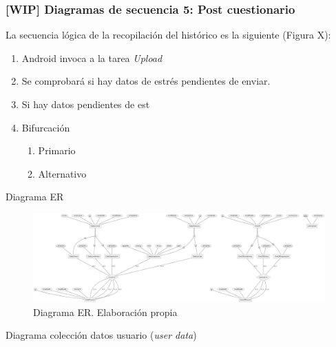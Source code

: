     \subsubsection{[WIP] Diagramas de secuencia 5: Post cuestionario}
        La secuencia lógica de la recopilación del histórico es la siguiente (Figura X):

        \begin{enumerate}
            \item Android invoca a la tarea \textit{Upload}
            \item Se comprobará si hay datos de estrés pendientes de enviar.
            \item Si hay datos pendientes de est
            \item Bifurcación
            \begin{enumerate}
                \item Primario
                \item Alternativo
            \end{enumerate}
        \end{enumerate}

Diagrama ER

\begin{figure}
    \centering
    \includegraphics[width=1\textwidth]{figures/bd/ER simple.png}
    \caption[Diagrama ER]{Diagrama ER. Elaboración propia}
    \label{figure:disenio:diagrama_er}
\end{figure}

Diagrama colección datos usuario (\textit{user data})

